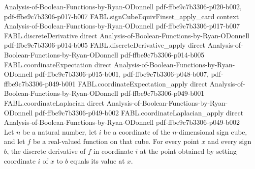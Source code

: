 \begin{theorem}
  {Analysis-of-Boolean-Functions-by-Ryan-ODonnell}
  {pdf-ffbe9c7b3306-p020-b002,
    pdf-ffbe9c7b3306-p017-b007}
\proofstep
  {FABL.signCubeEquivFinset_apply_card}
  {context}
  {Analysis-of-Boolean-Functions-by-Ryan-ODonnell}
  {pdf-ffbe9c7b3306-p017-b007}
\proofstep
  {FABL.discreteDerivative}
  {direct}
  {Analysis-of-Boolean-Functions-by-Ryan-ODonnell}
  {pdf-ffbe9c7b3306-p014-b005}
\proofstep
  {FABL.discreteDerivative_apply}
  {direct}
  {Analysis-of-Boolean-Functions-by-Ryan-ODonnell}
  {pdf-ffbe9c7b3306-p014-b005}
\proofstep
  {FABL.coordinateExpectation}
  {direct}
  {Analysis-of-Boolean-Functions-by-Ryan-ODonnell}
  {pdf-ffbe9c7b3306-p015-b001,
    pdf-ffbe9c7b3306-p048-b007,
    pdf-ffbe9c7b3306-p049-b001}
\proofstep
  {FABL.coordinateExpectation_apply}
  {direct}
  {Analysis-of-Boolean-Functions-by-Ryan-ODonnell}
  {pdf-ffbe9c7b3306-p049-b001}
\proofstep
  {FABL.coordinateLaplacian}
  {direct}
  {Analysis-of-Boolean-Functions-by-Ryan-ODonnell}
  {pdf-ffbe9c7b3306-p049-b002}
\proofstep
  {FABL.coordinateLaplacian_apply}
  {direct}
  {Analysis-of-Boolean-Functions-by-Ryan-ODonnell}
  {pdf-ffbe9c7b3306-p049-b002}
Let $n$ be a natural number, let $i$ be a coordinate of the $n$-dimensional sign cube,
and let $f$ be a real-valued function on that cube. For every point $x$ and every sign
$b$, the discrete derivative of $f$ in coordinate $i$ at the point obtained by setting
coordinate $i$ of $x$ to $b$ equals its value at $x$.
\end{theorem}

